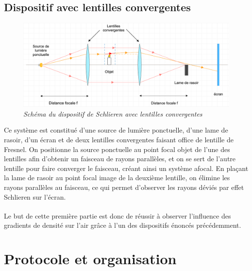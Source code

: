\subsection{Dispositif avec lentilles convergentes}
\begin{figure}[H]
	\centering
	\includegraphics[scale = 0.3]{figures/schlieren_lentilles.png}
	\caption{\small{\textit{Schéma du dispositif de Schlieren avec lentilles convergentes}}}
	\label{fig:schlieren_lentilles}
\end{figure}
Ce système est constitué d'une source de lumière ponctuelle, d'une lame de rasoir, d'un écran et de deux lentilles convergentes faisant office de lentille de Fresnel. On positionne la source ponctuelle au point focal objet de l'une des lentilles afin d'obtenir un faisceau de rayons parallèles, et on se sert de l'autre lentille pour faire converger le faisceau, créant ainsi un système afocal. En plaçant la lame de rasoir au point focal image de la deuxième lentille, on élimine les rayons parallèles au faisceau, ce qui permet d'observer les rayons déviés par effet Schlieren sur l'écran.
\\
\\
Le but de cette première partie est donc de réussir à observer l'influence des gradients de densité sur l'air grâce à l'un des dispositifs énoncés précédemment.
\section{Protocole et organisation}
